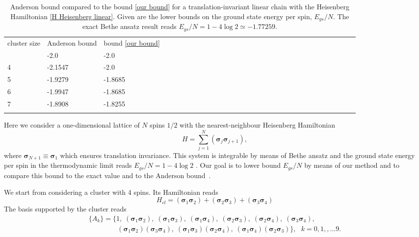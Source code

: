 \documentclass[a4paper]{jpconf}
\renewcommand\[{\begin{equation}}
\renewcommand\]{\end{equation}}
\newcommand{\ssigma}{{\bm \sigma}}
\begin{document}
\begin{table}
	\caption{\label{result} Anderson bound compared to the bound \eqref{our bound} for a translation-invariant linear chain with the Heisenberg Hamiltonian \eqref{H Heisenberg linear}. Given are the lower bounds on the ground state energy per spin,  $E_{gs}/N$. The exact Bethe ansatz result reads $E_{gs}/N=1-4\log 2\simeq -1.77259.$}
	\begin{center}
		\begin{tabular}{lllllllllllllllllllllllllllllll}
			\br
			cluster size&Anderson bound& bound \eqref{our bound}\\
			\mr
			3 &-2.0     & -2.0\\
			4 &-2.1547  & -2.0\\
			5 &-1.9279 & -1.8685\\
			6 &-1.9947 & -1.8685\\
			7 &-1.8908 & -1.8255\\
			\br
		\end{tabular}
	\end{center}
\end{table}

Here we consider a one-dimensional lattice of $N$ spins $1/2$ with the nearest-neighbour Heisenberg Hamiltonian
\begin{equation}\label{H Heisenberg linear}
	H = \sum_{j=1}^N \left( {{{\bm \ssigma}_j}{{\bm \ssigma}_{j+1}}} \right),
\end{equation}
where $\ssigma_{N+1}\equiv\ssigma_1$ which ensures translation invariance. This system is integrable by means of Bethe ansatz and the ground state energy per spin in the thermodynamic limit reads $E_{gs}/N=1-4\log 2$ \cite{Bethe}. Our goal is to lower bound $E_{gs}/N$ by means of our method and to compare this bound to the exact value and to the Anderson bound~\cite{Anderson}.

We start from considering a cluster with 4 spins. Its Hamiltonian reads
\[{H_{cl}} = ({{\ssigma}_1}{{\ssigma}_2}) + ({{\ssigma}_2}{{\ssigma}_3}) + ({{\ssigma}_3}{{\ssigma}_4})\label{Hcl}\]
The basis supported by the cluster reads
\[\label{basis 4 spins}
\begin{array}{l}
\{ {A_k}\}  = \{ 1,\;({{\ssigma}_1}{{\ssigma}_2}),\;({{\ssigma}_1}{{\ssigma}_3}),\;({{\ssigma}_1}{{\ssigma}_4}),\;({{\ssigma}_2}{{\ssigma}_3}),\;({{\ssigma}_2}{{\ssigma}_4}),\;({{\ssigma}_3}{{\ssigma}_4}),\;\\
\;\;\;\;\;\;\;\;\;\;\;\;\;\;\;({{\ssigma}_1}{{\ssigma}_2})({{\ssigma}_3}{{\ssigma}_4}),\;
({{\ssigma}_1}{{\ssigma}_3})({{\ssigma}_2}{{\ssigma}_4}),\;({{\ssigma}_1}{{\ssigma}_4})({{\ssigma}_2}{{\ssigma}_3})\}, ~~~k=0,1,,...9.
\end{array}\]
\end{document}

